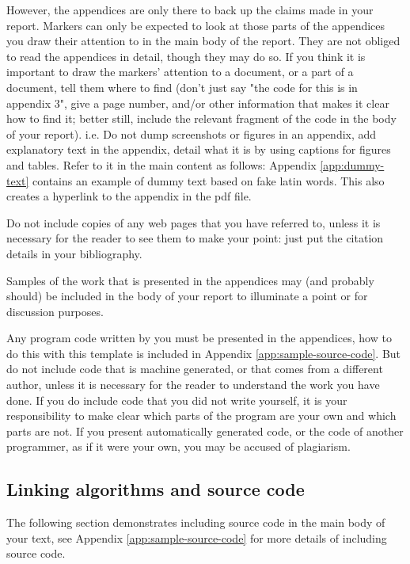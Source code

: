 \documentclass[a4paper, notitlepage, 11pt]{article}
\begin{document}
However, the  appendices are only  there to back up  the claims made in your report. Markers 
can only be expected to look at those parts of the appendices you draw their attention to in the 
main body of the report. They are not obliged to read the appendices in detail, though they may 
do so. If you think it is important to draw the markers' attention to a document, or a part of a 
document,  tell them where  to find (don't  just say "the code for  this is in  appendix 3", give a 
page number, and/or other information that makes it clear how to find it; better still, include 
the relevant fragment of the code in the body of your report).  i.e. Do not dump screenshots or figures in an appendix, add explanatory text in the appendix, detail what it is by using captions for figures and tables.  Refer to it in the main content as follows: Appendix \ref{app:dummy-text} contains an example of dummy text based on fake latin words.  This also creates a hyperlink to the appendix in the pdf file.


Do not include copies of any web pages that you have referred to, unless it is necessary for the 
reader to see them to make your point: just put the citation details in your bibliography.  

Samples of the work that is presented in the appendices may (and probably should) be included 
in the body of your report to illuminate a point or for discussion purposes. 

Any program code written by you must be presented in the appendices, how to do this with this template is included in Appendix \ref{app:sample-source-code}. But do not include code that is machine generated, or that comes from a different author, unless it is necessary for the reader to understand the work you have done. If you do include code that you did not write yourself, it is your responsibility to make clear which parts of the program are your own and which  parts  are  not.  If  you  present  automatically  generated  code,  or  the  code  of  another programmer, as if it were your own, you may be accused of plagiarism. 

\subsection{Linking algorithms and source code}

The following section demonstrates including source code in the main body of your text, see Appendix \ref{app:sample-source-code} for more details of including source code.
\end{document}

